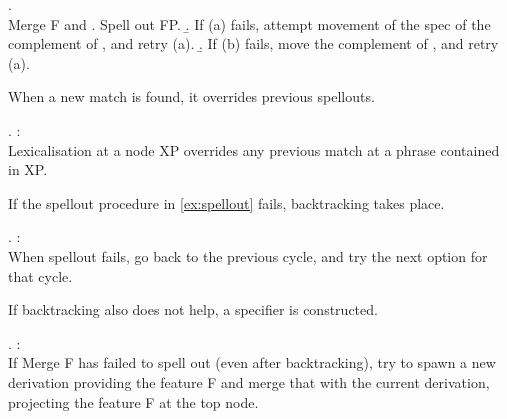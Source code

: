 \ex. \\
Merge F and \label{ex:spellout}
 \a. Spell out FP.
 \b. If (a) fails, attempt movement of the spec of the complement of , and retry (a).
 \b. If (b) fails, move the complement of , and retry (a).

When a new match is found, it overrides previous spellouts.

\ex.  \citep{starke2018}:\\
Lexicalisation at a node XP overrides any previous match at a phrase contained in XP.

If the spellout procedure in \ref{ex:spellout} fails, backtracking takes place.

\ex.  \citep{starke2018}:\\
When spellout fails, go back to the previous cycle, and try the next option for that cycle.\label{ex:backtracking}

If backtracking also does not help, a specifier is constructed.

\ex.  \citep{starke2018}:\\
If Merge F has failed to spell out (even after backtracking), try to spawn a new derivation providing the feature F and merge that with the current derivation, projecting the feature F at the top node.\label{ex:specformation}





\phantom{hi}

